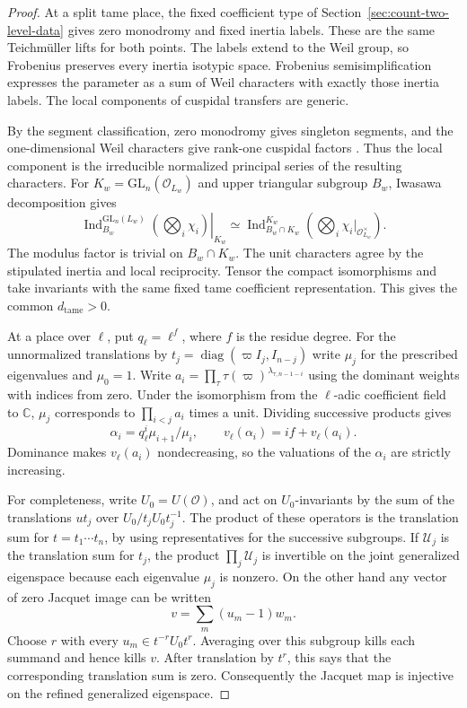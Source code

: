 \begin{proof}
At a split tame place, the fixed coefficient type
of Section~\ref{sec:count-two-level-data} gives
zero monodromy and fixed inertia labels. These are
the same Teichm\"uller lifts for both points.
The labels extend to the Weil group, so Frobenius
preserves every inertia isotypic space. Frobenius
semisimplification expresses the parameter as a
sum of Weil characters with exactly those inertia
labels. The local components of cuspidal transfers
are generic.

By the segment classification,
zero monodromy gives singleton segments, and the
one-dimensional Weil characters give rank-one
cuspidal factors \cite[Theorem 9.7]{zelevinsky}.
Thus the local component is the irreducible
normalized principal series of the resulting
characters. For \(K_w=\mathrm{GL}_n(\mathcal O_{L_w})\) and upper
triangular subgroup \(B_w\), Iwasawa decomposition gives
\[
 \left.\operatorname{Ind}_{B_w}^{\mathrm{GL}_n(L_w)}
                      (\textstyle\bigotimes_i\chi_i)\right|_{K_w}
   \simeq
 \operatorname{Ind}_{B_w\cap K_w}^{K_w}
                         (\textstyle\bigotimes_i\chi_i|_{\mathcal O_{L_w}^\times}).
\]
The modulus factor is trivial on \(B_w\cap K_w\).
The unit characters agree by the stipulated inertia
and local reciprocity. Tensor the compact isomorphisms
and take invariants with the same fixed tame coefficient
representation. This gives the common \(d_{\mathrm{tame}}>0\).

At a place over \(\ell\), put \(q_\ell=\ell^f\),
where \(f\) is the residue degree. For the
unnormalized translations by
\(t_j=\operatorname{diag}(\varpi I_j,I_{n-j})\)
write \(\mu_j\) for the prescribed eigenvalues and
\(\mu_0=1\). Write
\(a_i=\prod_\tau \tau(\varpi)^{\lambda_{\tau,n-1-i}}\)
using the dominant weights with indices from zero.
Under the isomorphism from the \(\ell\)-adic
coefficient field to \(\mathbb C\), \(\mu_j\)
corresponds to \(\prod_{i<j}a_i\) times a unit. Dividing
successive products gives
\[
  \alpha_i=q_\ell^i\mu_{i+1}/\mu_i,\qquad
  v_\ell(\alpha_i)=if+v_\ell(a_i).
\]
Dominance makes \(v_\ell(a_i)\) nondecreasing, so the
valuations of the \(\alpha_i\) are strictly increasing.

For completeness, write \(U_0=U(\mathcal O)\),
and act on \(U_0\)-invariants by the sum of the
translations \(ut_j\) over
\(U_0/t_jU_0t_j^{-1}\). The product of these operators
is the translation sum for \(t=t_1\cdots t_n\), by
using representatives for the successive
subgroups. If \(\mathcal U_j\) is the translation sum for \(t_j\),
the product \(\prod_j\mathcal U_j\) is invertible on
the joint generalized eigenspace because each eigenvalue
\(\mu_j\) is nonzero. On the other hand any vector of
zero Jacquet image can be written
\[
                      v=\sum_m (u_m-1)w_m .
\]
Choose \(r\) with every \(u_m\in t^{-r}U_0t^r\).
Averaging over this subgroup kills each summand and hence
kills \(v\). After translation
by \(t^r\), this says that the corresponding
translation sum is zero. Consequently the
Jacquet map is injective on the refined
generalized eigenspace.


\end{proof}
